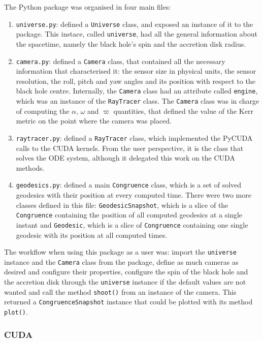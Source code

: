 The Python package was organised in four main files:
\begin{enumerate}
	\item \lstinline{universe.py}: defined a \lstinline{Universe} class, and exposed an instance of it to the package. This instace, called \lstinline{universe}, had all the general information about the spacetime, namely the black hole's spin and the accretion disk radius.
	\item \lstinline{camera.py}: defined a \lstinline{Camera} class, that contained all the necessary information that characterised it: the sensor size in physical units, the sensor resolution, the roll, pitch and yaw angles and its position with respect to the black hole centre. Internally, the \lstinline{Camera} class had an attribute called \lstinline{engine}, which was an instance of the \lstinline{RayTracer} class. The \lstinline{Camera} class was in charge of computing the $\alpha$, $\omega$ and $\varpi$ quantities, that defined the value of the Kerr metric on the point where the camera was placed.
	\item \lstinline{raytracer.py}: defined a \lstinline{RayTracer} class, which implemented the PyCUDA calls to the \ac{CUDA} kernels. From the user perspective, it is the class that solves the \ac{ODE} system, although it delegated this work on the \ac{CUDA} methods.
	\item \lstinline{geodesics.py}: defined a main \lstinline{Congruence} class, which is a set of solved geodesics with their position at every computed time. There were two more classes defined in this file: \lstinline{GeodesicSnapshot}, which is a slice of the \lstinline{Congruence} containing the position of all computed geodesics at a single instant and \lstinline{Geodesic}, which is a slice of \lstinline{Congruence} containing one single geodesic with its position at all computed times.
\end{enumerate}

The workflow when using this package as a user was: import the \lstinline{universe} instance and the \lstinline{Camera} class from the package, define as much cameras as desired and configure their properties, configure the spin of the black hole and the accretion disk through the \lstinline{universe} instance if the default values are not wanted and call the method \lstinline{shoot()} from an instance of the camera. This returned a \lstinline{CongruenceSnapshot} instance that could be plotted with its method \lstinline{plot()}.

\subsubsection*{CUDA}


